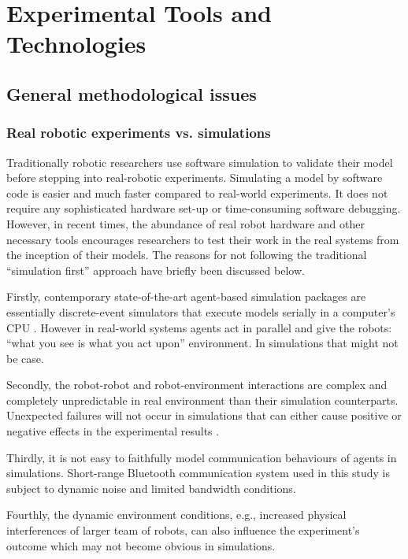 \chapter{Experimental Tools and Technologies}
\label{expt-tools}
\section{General methodological issues}
\subsection{Real robotic experiments vs. simulations}
Traditionally robotic researchers use software simulation to validate their model before stepping into real-robotic experiments. Simulating a model by software code is easier and much faster compared to real-world experiments. It does not require any sophisticated hardware set-up or time-consuming software debugging. However, in recent times, the abundance of real robot hardware and other necessary tools encourages researchers to test their work in the real systems from the inception of their models. The reasons for not following the traditional ``simulation first'' approach have briefly been discussed below. 

Firstly, contemporary state-of-the-art agent-based simulation packages are essentially discrete-event simulators that execute models serially in a computer's CPU \cite{Lysenko+2008}. However in real-world systems agents act in parallel and give the robots:  ``what you see is what you act upon'' environment. In simulations that might not be case.

Secondly, the robot-robot and robot-environment interactions are complex and completely unpredictable in real environment than their simulation counterparts. Unexpected failures will not occur in simulations that can either cause positive or negative effects in the experimental results \cite{Krieger+2000}.

Thirdly, it is not easy to faithfully model communication behaviours of agents in simulations. Short-range Bluetooth communication system used in this study is subject to dynamic noise and limited bandwidth conditions.

Fourthly, the dynamic environment conditions, e.g., increased physical interferences of larger team of robots, can also influence the experiment's outcome which may not become obvious in simulations.


